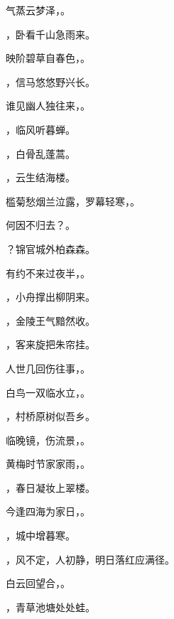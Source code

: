 \documentclass[12pt, a4paper, addpoints]{exam}
\begin{document}
\begin{multicols}{2}
\begin{questions}
\question[2] 气蒸云梦泽，\uline{\qquad\qquad\qquad}。

\question[2] \uline{\qquad\qquad\qquad}，卧看千山急雨来。

\question[2] 映阶碧草自春色，\uline{\qquad\qquad\qquad}。

\question[2] \uline{\qquad\qquad\qquad}，信马悠悠野兴长。

\question[2] 谁见幽人独往来，\uline{\qquad\qquad\qquad}。

\question[2] \uline{\qquad\qquad\qquad}，临风听暮蝉。

\question[2] \uline{\qquad\qquad\qquad}，白骨乱蓬蒿。

\question[2] \uline{\qquad\qquad\qquad}，云生结海楼。

\question[2] 槛菊愁烟兰泣露，罗幕轻寒，\uline{\qquad\qquad\qquad}。

\question[1] 何因不归去？\uline{\qquad\qquad\qquad}。

\question[2] \uline{\qquad\qquad\qquad}？锦官城外柏森森。

\question[2] 有约不来过夜半，\uline{\qquad\qquad\qquad}。

\question[2] \uline{\qquad\qquad\qquad}，小舟撑出柳阴来。

\question[2] \uline{\qquad\qquad\qquad}，金陵王气黯然收。

\question[2] \uline{\qquad\qquad\qquad}，客来旋把朱帘挂。

\question[2] 人世几回伤往事，\uline{\qquad\qquad\qquad}。

\question[2] 白鸟一双临水立，\uline{\qquad\qquad\qquad}。

\question[2] \uline{\qquad\qquad\qquad}，村桥原树似吾乡。

\question[2] 临晚镜，伤流景，\uline{\qquad\qquad\qquad}。

\question[2] 黄梅时节家家雨，\uline{\qquad\qquad\qquad}。

\question[2] \uline{\qquad\qquad\qquad}，春日凝妆上翠楼。

\question[2] 今逢四海为家日，\uline{\qquad\qquad\qquad}。

\question[2] \uline{\qquad\qquad\qquad}，城中增暮寒。

\question[2] \uline{\qquad\qquad\qquad}，风不定，人初静，明日落红应满径。

\question[2] 白云回望合，\uline{\qquad\qquad\qquad}。

\question[2] \uline{\qquad\qquad\qquad}，青草池塘处处蛙。


\end{questions}
\end{multicols}
\end{document}

